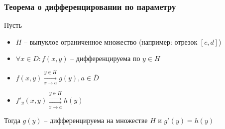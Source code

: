 \subsubsection{Теорема о дифференцировании по параметру}
\begin{theorem*}
    Пусть
    \begin{itemize}
        \item $H$ -- выпуклое ограниченное множество (например: отрезок $[c, d]$)
        \item $\forall x \in D: f(x, y)$ -- дифференцируема по $y \in H$
        \item $f(x, y) \overset{y \in H}{\underset{x \to a}{\to}} g(y), a \in \overline{D}$
        \item $f'_y(x, y) \overset{y \in H}{\underset{x \to a}{\rightrightarrows}} h(y)$
    \end{itemize}
    Тогда $g(y)$ -- дифференцируема на множестве $H$ и $g'(y) = h(y)$
\end{theorem*}
